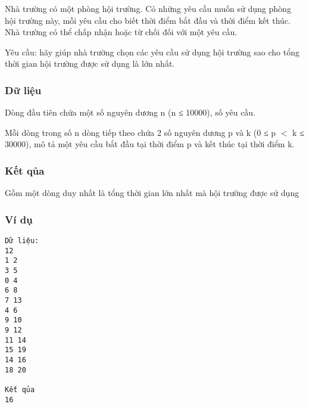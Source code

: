 



   Nhà trường có một phòng hội trường. Có những yêu cầu muốn sử dụng phòng hội trường này, mỗi yêu cầu cho biết thời điểm bắt đầu và thời điểm kết thúc. Nhà trường có thể chấp nhận hoặc từ chối đối với một yêu cầu.  

   Yêu cầu: hãy giúp nhà trường chọn các yêu cầu sử dụng hội trường sao cho tổng thời gian hội trường được sử dụng là lớn nhất.  

\subsubsection{   Dữ liệu  }

   Dòng đầu tiên chứa một số nguyên dương n (n ≤ 10000), số yêu cầu.  

   Mỗi dòng trong số n dòng tiếp theo chứa 2 số nguyên dương p và k (0 ≤ p $<$ k ≤ 30000), mô tả một yêu cầu bắt đầu tại thời điểm p và kết thúc tại thời điểm k.  

\subsubsection{   Kết qủa  }

   Gồm một dòng duy nhất là tổng thời gian lớn nhất mà hội trường được sử dụng  

\subsubsection{   Ví dụ  }
\begin{verbatim}
Dữ liệu:
12
1 2
3 5
0 4
6 8
7 13
4 6
9 10
9 12
11 14
15 19
14 16
18 20

Kết qủa
16
\end{verbatim}